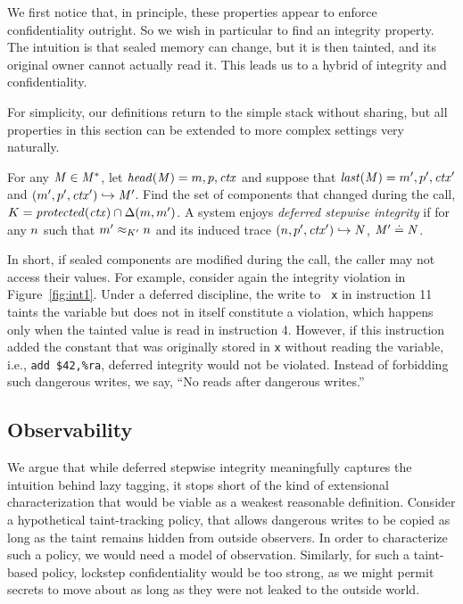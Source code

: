 \documentclass[acmsmall,review,anonymous]{acmart}\settopmatter{printfolios=true,printccs=false,printacmref=false}
\begin{document}
We first notice that, in principle, these properties appear to enforce
confidentiality outright. So we wish in particular to find an integrity
property. The intuition is that sealed memory can change, but it is
then tainted, and its original owner cannot actually read it. This
leads us to a hybrid of integrity and confidentiality.

For simplicity, our definitions return to the simple stack without sharing,
but all properties in this section can be extended to more complex settings
very naturally.

For any \(\mathit{M} \in \mathit{M}^*\), let \(\mathit{head}(\mathit{M}) = m,p,\mathit{ctx}\) and
suppose that \(\mathit{last}(\mathit{M}) = m',p',\mathit{ctx}'\) and
\((m',p',\mathit{ctx}') \hookrightarrow \mathit{M}'\). Find the set of components
that changed during the call, \(K = \mathit{protected}(\mathit{ctx}) \cap \Delta(m,m')\).
A system enjoys {\em deferred stepwise integrity} if for any \(n\) such that
\(m' \approx_{K'} n\) and its induced trace
\((n,p',\mathit{ctx}') \hookrightarrow \mathit{N}\), \(\mathit{M}' \doteq \mathit{N}\).

In short, if sealed components are modified during the call, the caller may not
access their values. 
%
For example, consider again the integrity violation in
Figure~\ref{fig:int1}. Under a deferred discipline, the write to {\tt
  x} in instruction 11 taints the variable but does not in itself
constitute a violation, which happens only when the tainted value is
read in instruction 4. However, if this instruction added the constant
that was originally stored in {\tt x} without reading the variable,
i.e., {\tt add \$42,\%ra}, deferred integrity would not be violated.
Instead of forbidding such dangerous writes, we say,
``No reads after dangerous writes.''

\subsection{Observability}

We argue that while deferred stepwise integrity meaningfully captures the intuition
behind lazy tagging, it stops short of the kind of extensional characterization
that would be viable as a weakest reasonable definition. Consider a hypothetical
taint-tracking policy, that allows dangerous writes to be copied as long as the
taint remains hidden from outside observers. In order to characterize
such a policy, we would need a model of observation.
Similarly, for such a taint-based policy, lockstep confidentiality would be too
strong, as we might permit secrets to move about as long as they were not
leaked to the outside world.
\end{document}

